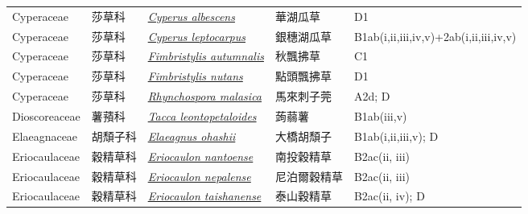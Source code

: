 {\begin{longtable}{p{2.5cm}p{2cm}p{5cm}p{2.5cm}p{3cm}}
    Cyperaceae & 莎草科 & \href{http://www.theplantlist.org/tpl1.1/search?q=Cyperus+albescens}{\textit{Cyperus albescens} } & 華湖瓜草 & D1 \index{Cyperus@\textit{Cyperus}!albescens@\textit{albescens}}  \index{華湖瓜草} \\
    Cyperaceae & 莎草科 & \href{http://www.theplantlist.org/tpl1.1/search?q=Cyperus+leptocarpus}{\textit{Cyperus leptocarpus} } & 銀穗湖瓜草 & B1ab(i,ii,iii,iv,v)+2ab(i,ii,iii,iv,v) \index{Cyperus@\textit{Cyperus}!leptocarpus@\textit{leptocarpus}}  \index{銀穗湖瓜草} \\
    Cyperaceae & 莎草科 & \href{http://www.theplantlist.org/tpl1.1/search?q=Fimbristylis+autumnalis}{\textit{Fimbristylis autumnalis} } & 秋飄拂草 & C1 \index{Fimbristylis@\textit{Fimbristylis}!autumnalis@\textit{autumnalis}}  \index{秋飄拂草} \\
    Cyperaceae & 莎草科 & \href{http://www.theplantlist.org/tpl1.1/search?q=Fimbristylis+nutans}{\textit{Fimbristylis nutans} } & 點頭飄拂草 & D1 \index{Fimbristylis@\textit{Fimbristylis}!nutans@\textit{nutans}}  \index{點頭飄拂草} \\
    Cyperaceae & 莎草科 & \href{http://www.theplantlist.org/tpl1.1/search?q=Rhynchospora+malasica}{\textit{Rhynchospora malasica} } & 馬來刺子莞 & A2d; D \index{Rhynchospora@\textit{Rhynchospora}!malasica@\textit{malasica}}  \index{馬來刺子莞} \\
    Dioscoreaceae & 薯蕷科 & \href{http://www.theplantlist.org/tpl1.1/search?q=Tacca+leontopetaloides}{\textit{Tacca leontopetaloides} } & 蒟蒻薯 & B1ab(iii,v) \index{Tacca@\textit{Tacca}!leontopetaloides@\textit{leontopetaloides}}  \index{蒟蒻薯} \\
    Elaeagnaceae & 胡頹子科 & \href{http://www.theplantlist.org/tpl1.1/search?q=Elaeagnus+ohashii}{\textit{Elaeagnus ohashii} } & 大橋胡頹子 & B1ab(i,ii,iii,v); D \index{Elaeagnus@\textit{Elaeagnus}!ohashii@\textit{ohashii}}  \index{大橋胡頹子} \\
    Eriocaulaceae & 穀精草科 & \href{http://www.theplantlist.org/tpl1.1/search?q=Eriocaulon+nantoense}{\textit{Eriocaulon nantoense} } & 南投穀精草 & B2ac(ii, iii) \index{Eriocaulon@\textit{Eriocaulon}!nantoense@\textit{nantoense}}  \index{南投穀精草} \\
    Eriocaulaceae & 穀精草科 & \href{http://www.theplantlist.org/tpl1.1/search?q=Eriocaulon+nepalense}{\textit{Eriocaulon nepalense} } & 尼泊爾穀精草 & B2ac(ii, iii) \index{Eriocaulon@\textit{Eriocaulon}!nepalense@\textit{nepalense}}  \index{尼泊爾穀精草} \\
    Eriocaulaceae & 穀精草科 & \href{http://www.theplantlist.org/tpl1.1/search?q=Eriocaulon+taishanense}{\textit{Eriocaulon taishanense} } & 泰山穀精草 & B2ac(ii, iv); D \index{Eriocaulon@\textit{Eriocaulon}!taishanense@\textit{taishanense}}  \index{泰山穀精草} \\

\end{longtable}}
